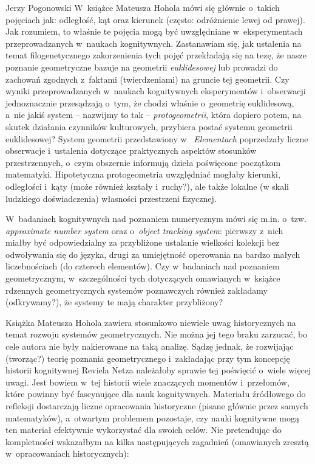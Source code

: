 \begin{newrevplenv}{Jerzy Pogonowski}
W~książce Mateusza Hohola mówi się głównie o~takich pojęciach jak:
odległość, kąt oraz kierunek (często: odróżnienie lewej od
prawej). Jak rozumiem, to właśnie te pojęcia mogą być uwzględniane
w~eksperymentach przeprowadzanych w~naukach kognitywnych.
Zastanawiam się, jak ustalenia na temat filogenetycznego
zakorzenienia tych pojęć przekładają się na tezę, że nasze
poznanie geometryczne bazuje na geometrii {\em euklidesowej} lub
prowadzi do zachowań zgodnych z~faktami (twierdzeniami) na gruncie
tej geometrii. Czy wyniki przeprowadzanych w~naukach kognitywnych
eksperymentów i~obserwacji jednoznacznie przesądzają o~tym, że
chodzi właśnie o~geometrię euklidesową, a~nie jakiś system --
nazwijmy to tak -- {\em protogeometrii}, która dopiero potem, na
skutek działania czynników kulturowych, przybiera postać systemu
geometrii euklidesowej? System geometrii przedstawiony w~{\em
Elementach} poprzedzały liczne obserwacje i~ustalenia dotyczące
praktycznych aspektów stosunków przestrzennych, o~czym obszernie
informują dzieła poświęcone początkom matematyki. Hipotetyczna
protogeometria uwzględniać mogłaby kierunki, odległości i~kąty
(może również kształy i~ruchy?), ale także lokalne (w skali
ludzkiego doświadczenia) własności przestrzeni fizycznej.

W~badaniach kognitywnych nad poznaniem numerycznym mówi się m.in.
o~tzw. {\em approximate number system} oraz o~{\em object tracking
system}: pierwszy z~nich miałby być odpowiedzialny za przybliżone
ustalanie wielkości kolekcji bez odwoływania się do języka, drugi
za umiejętność operowania na bardzo małych liczebnościach (do
czterech elementów). Czy w~badaniach nad poznaniem geometrycznym,
w~szczególności tych dotyczących omawianych w~książce rdzennych
geometrycznych systemów poznawczych również zakładamy
(odkrywamy?), że systemy te mają charakter przybliżony?

Książka Mateusza Hohola zawiera stosunkowo niewiele uwag
historycznych na temat rozwoju systemów geometrycznych. Nie można
jej tego braku zarzucać, bo cele autora nie były nakierowane na
taką analizę. Sądzę jednak, że rozwijając (tworząc?) teorię
poznania geometrycznego i~zakładając przy tym koncepcję historii
kognitywnej Reviela Netza należałoby sprawie tej poświęcić o~wiele
więcej uwagi. Jest bowiem w~tej historii wiele znaczących momentów
i~przełomów, które powinny być fascynujące dla nauk kognitywnych.
Materiału źródłowego do refleksji dostarczają liczne opracowania
historyczne (pisane głównie przez samych matematyków), a~otwartym
problemem pozostaje, czy nauki kognitywne mogą ten materiał
efektywnie wykorzystać dla swoich celów. Nie pretendując do
kompletności wskazałbym na kilka następujących zagadnień
(omawianych zresztą w~opracowaniach historycznych):


\end{newrevplenv}
